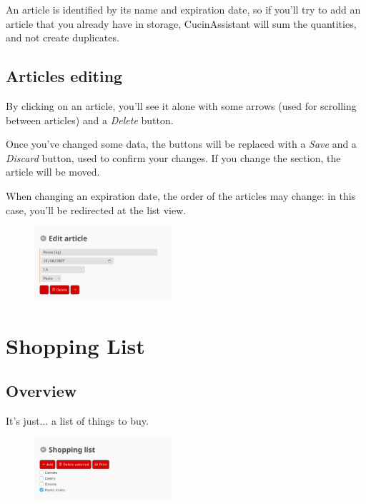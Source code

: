 \documentclass[12pt, a4paper]{article}
\begin{document}
    An article is identified by its name and expiration date, so if you'll try
    to add an article that you already have in storage, CucinAssistant will sum
    the quantities, and not create duplicates. 

    \subsection{Articles editing}

    By clicking on an article, you'll see it alone with some arrows (used for
    scrolling between articles) and a \emph{Delete} button.

    Once you've changed some data, the buttons will be replaced with a
    \emph{Save} and a \emph{Discard} button, used to confirm your changes.
    If you change the section, the article will be moved.

    When changing an expiration date, the order of the articles may change: in
    this case, you'll be redirected at the list view.

    \begin{figure}[H]
        \centering
        \includegraphics[width=0.45\textwidth]{assets/en/article.png}
    \end{figure}



    \section{Shopping List}

    \subsection{Overview}

    It's just... a list of things to buy.

    \begin{figure}[H]
        \centering
        \includegraphics[width=0.45\textwidth]{assets/en/shopping_list.png}
    \end{figure}
\end{document}

